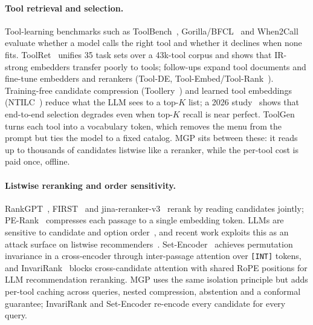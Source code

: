 \documentclass[sigconf,review,anonymous]{acmart}
\newcommand{\method}{MGP}
\begin{document}
\paragraph{Tool retrieval and selection.}
Tool-learning benchmarks such as ToolBench~\cite{qin2024toolllm}, Gorilla/BFCL~\cite{patil2024gorilla,patil2025bfcl} and When2Call~\cite{ross2025when2call} evaluate whether a model calls the right tool and whether it declines when none fits.
ToolRet~\cite{shi2025toolret} unifies 35 task sets over a 43k-tool corpus and shows that IR-strong embedders transfer poorly to tools; follow-ups expand tool documents and fine-tune embedders and rerankers (Tool-DE, Tool-Embed/Tool-Rank~\cite{lu2025tooldenroll}).
Training-free candidate compression (Toollery~\cite{tian2026toollery}) and learned tool embeddings (NTILC~\cite{krikorian2026ntilc}) reduce what the LLM sees to a top-$K$ list; a 2026 study~\cite{zhou2026paradox} shows that end-to-end selection degrades even when top-$K$ recall is near perfect.
ToolGen~\cite{wang2025toolgen} turns each tool into a vocabulary token, which removes the menu from the prompt but ties the model to a fixed catalog.
\method{} sits between these: it reads up to thousands of candidates listwise like a reranker, while the per-tool cost is paid once, offline.

\paragraph{Listwise reranking and order sensitivity.}
RankGPT~\cite{sun2023rankgpt}, FIRST~\cite{reddy2024first} and jina-reranker-v3~\cite{wang2025jinav3} rerank by reading candidates jointly; PE-Rank~\cite{liu2025perank} compresses each passage to a single embedding token.
LLMs are sensitive to candidate and option order~\cite{liu2024lost,zheng2024pride}, and recent work exploits this as an attack surface on listwise recommenders~\cite{bitoattack2026}.
Set-Encoder~\cite{schlatt2025setencoder} achieves permutation invariance in a cross-encoder through inter-passage attention over \texttt{[INT]} tokens, and InvariRank~\cite{bito2026invarirank} blocks cross-candidate attention with shared RoPE positions for LLM recommendation reranking.
\method{} uses the same isolation principle but adds per-tool caching across queries, nested compression, abstention and a conformal guarantee; InvariRank and Set-Encoder re-encode every candidate for every query.
\end{document}
